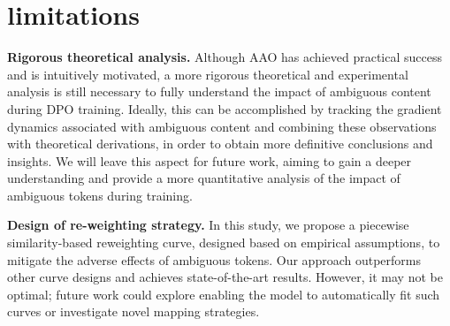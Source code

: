 \section{limitations}
\textbf{Rigorous theoretical analysis.} Although AAO has achieved practical success and is intuitively motivated, a more rigorous theoretical and experimental analysis is still necessary to fully understand the impact of ambiguous content during DPO training. Ideally, this can be accomplished by tracking the gradient dynamics associated with ambiguous content and combining these observations with theoretical derivations, in order to obtain more definitive conclusions and insights. We will leave this aspect for future work, aiming to gain a deeper understanding and provide a more quantitative analysis of the impact of ambiguous tokens during training.

\textbf{Design of re-weighting strategy.} 
In this study, we propose a piecewise similarity-based reweighting curve, designed based on empirical assumptions, to mitigate the adverse effects of ambiguous tokens. Our approach outperforms other curve designs and achieves state-of-the-art results. However, it may not be optimal; future work could explore enabling the model to automatically fit such curves or investigate novel mapping strategies.